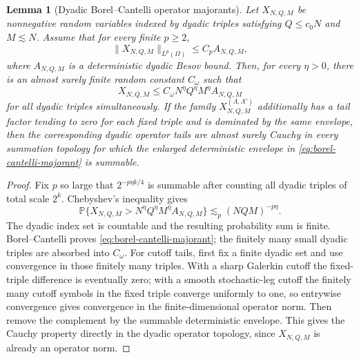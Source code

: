 \documentclass[10pt]{amsart}
\numberwithin{equation}{section}
\theoremstyle{plain}
\newtheorem{lemma}[theorem]{Lemma}
\theoremstyle{definition}
\theoremstyle{remark}
\newcommand{\Prob}{\mathbb{P}}
\begin{document}
\begin{lemma}[Dyadic Borel--Cantelli operator majorants]\label{lem:dyadic-borel-cantelli-operators}
Let $X_{N,Q,M}$ be nonnegative random variables indexed by dyadic triples satisfying $Q\le c_0N$ and $M\lesssim N$.  Assume that for every finite $p\ge2$,
\[
        \|X_{N,Q,M}\|_{L^p(\Omega)}\le C_p A_{N,Q,M},
\]
where $A_{N,Q,M}$ is a deterministic dyadic Besov bound.  Then, for every $\eta>0$, there is an almost surely finite random constant $C_\omega$ such that
\begin{equation}\label{eq:borel-cantelli-majorant}
        X_{N,Q,M}\le C_\omega
        N^\eta Q^\eta M^\eta A_{N,Q,M}
\end{equation}
for all dyadic triples simultaneously.  If the family $X_{N,Q,M}^{(\Lambda,\Lambda')}$ additionally has a tail factor tending to zero for each fixed triple and is dominated by the same envelope, then the corresponding dyadic operator tails are almost surely Cauchy in every summation topology for which the enlarged deterministic envelope in \eqref{eq:borel-cantelli-majorant} is summable.
\end{lemma}

\begin{proof}
Fix $p$ so large that $2^{-p\eta k/4}$ is summable after counting all dyadic triples of total scale $2^k$.  Chebyshev's inequality gives
\[
\Prob\{X_{N,Q,M}>N^\eta Q^\eta M^\eta A_{N,Q,M}\}
\lesssim_p (NQM)^{-p\eta}.
\]
The dyadic index set is countable and the resulting probability sum is finite.  Borel--Cantelli proves \eqref{eq:borel-cantelli-majorant}; the finitely many small dyadic triples are absorbed into $C_\omega$.  For cutoff tails, first fix a finite dyadic set and use convergence in those finitely many triples.  With a sharp Galerkin cutoff the fixed-triple difference is eventually zero; with a smooth stochastic-leg cutoff the finitely many cutoff symbols in the fixed triple converge uniformly to one, so entrywise convergence gives convergence in the finite-dimensional operator norm.  Then remove the complement by the summable deterministic envelope.  This gives the Cauchy property directly in the dyadic operator topology, since $X_{N,Q,M}$ is already an operator norm.
\end{proof}
\end{document}
